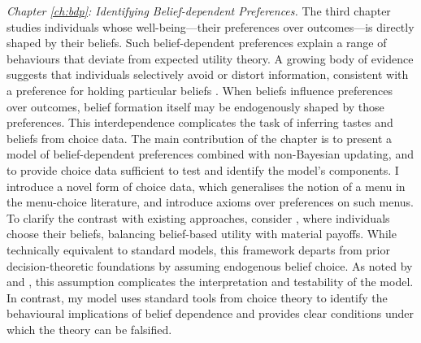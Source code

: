 \emph{Chapter \ref{ch:bdp}: Identifying Belief-dependent Preferences.} The third chapter studies individuals whose well-being—their preferences over outcomes—is directly shaped by their beliefs. Such belief-dependent preferences explain a range of behaviours that deviate from expected utility theory. A growing body of evidence suggests that individuals selectively avoid or distort information, consistent with a preference for holding particular beliefs \citep{golmanInformationAvoidance2017}. When beliefs influence preferences over outcomes, belief formation itself may be endogenously shaped by those preferences. This interdependence complicates the task of inferring tastes and beliefs from choice data. The main contribution of the chapter is to present a model of belief-dependent preferences combined with non-Bayesian updating, and to provide choice data sufficient to test and identify the model’s components. I introduce a novel form of choice data, which generalises the notion of a menu in the menu-choice literature, and introduce axioms over preferences on such menus. To clarify the contrast with existing approaches, consider \cite{brunnermeierOptimalExpectations2005}, where individuals choose their beliefs, balancing belief-based utility with material payoffs. While technically equivalent to standard models, this framework departs from prior decision-theoretic foundations by assuming endogenous belief choice. As noted by \cite{eliazCanAnticipatoryFeelings2006} and \cite{spieglerBehavioralEconomicsAtheoretical2019}, this assumption complicates the interpretation and testability of the model. In contrast, my model uses standard tools from choice theory to identify the behavioural implications of belief dependence and provides clear conditions under which the theory can be falsified.

